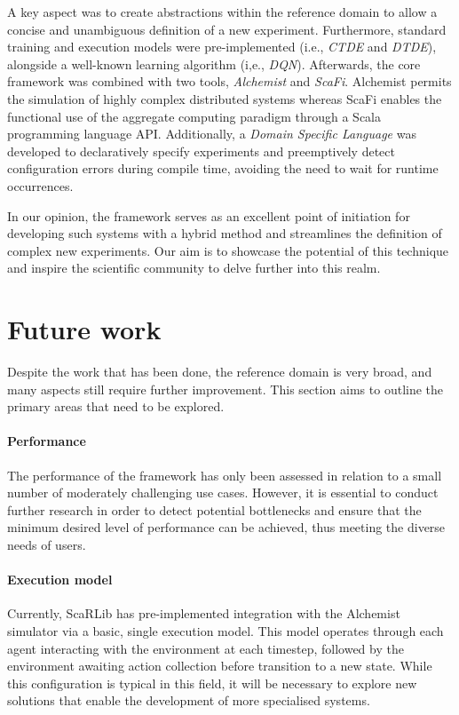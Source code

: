 \documentclass[12pt,a4paper,openright,twoside]{book}
\begin{document}
A key aspect was to create abstractions within the reference domain to allow a concise and unambiguous definition of a new experiment. 
    Furthermore, standard training and execution models were pre-implemented (i.e., \emph{CTDE} and \emph{DTDE}), alongside a well-known learning algorithm (i,e., \emph{DQN}). 
    Afterwards, the core framework was combined with two tools, \emph{Alchemist} and \emph{ScaFi}. Alchemist permits the simulation of highly complex
    distributed systems whereas ScaFi enables the functional use of the aggregate computing paradigm through a Scala 
    programming language API. Additionally, a \emph{Domain Specific Language} was developed to declaratively specify 
    experiments and preemptively detect configuration errors during compile time, avoiding the need to wait for runtime occurrences.

In our opinion, the framework serves as an excellent point of initiation for developing such systems with a hybrid method 
    and streamlines the definition of complex new experiments. Our aim is to showcase the potential of this technique 
    and inspire the scientific community to delve further into this realm.

\section{Future work}

Despite the work that has been done, the reference domain is very broad, 
    and many aspects still require further improvement. This section aims to outline the primary areas 
    that need to be explored.

\paragraph{Performance}
The performance of the framework has only been assessed in relation to a small number of moderately 
    challenging use cases. However, it is essential to conduct further research in order to detect 
    potential bottlenecks and ensure that the minimum desired level of performance can be achieved, 
    thus meeting the diverse needs of users.

\paragraph{Execution model}
Currently, ScaRLib has pre-implemented integration with the Alchemist simulator via a basic, single execution model. 
    This model operates through each agent interacting with the environment at each timestep, followed by the
    environment awaiting action collection before transition to a new state. While this configuration is typical 
    in this field, it will be necessary to explore new solutions that enable the development of more specialised systems.
\end{document}
